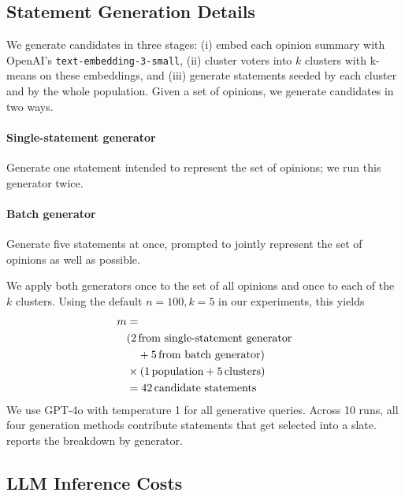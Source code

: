 \documentclass[letterpaper]{article} %
\begin{document}
\subsection{Statement Generation Details}
\label{sec:statement-generation}

We generate candidates in three stages: (i) embed each opinion summary with OpenAI's \texttt{text-embedding-3-small}, (ii) cluster voters into \(k\) clusters with k-means on these embeddings, and (iii) generate statements seeded by each cluster and by the whole population.
Given a set of opinions, we generate candidates in two ways.

\paragraph{Single-statement generator}
Generate one statement intended to represent the set of opinions; we run this generator twice.

\paragraph{Batch generator}
Generate five statements at once, prompted to jointly represent the set of opinions as well as possible.

We apply both generators once to the set of all opinions and once to each of the \(k\) clusters.
Using the default \(n=100, k=5\) in our experiments, this yields
\[
\begin{aligned}
m&= \\
&(2\,\text{from single\text{-}statement generator} \\
&\quad + 5\,\text{from batch generator}) \\
&\times (1\,\text{population} + 5\,\text{clusters}) \\
&= 42\,\text{candidate statements}
\end{aligned}
\]
We use GPT-4o with temperature 1 for all generative queries.
Across 10 runs, all four generation methods contribute statements that get selected into a slate.
 reports the breakdown by generator.

\subsection{LLM Inference Costs}
\label{sec:inference-costs}
\end{document}
